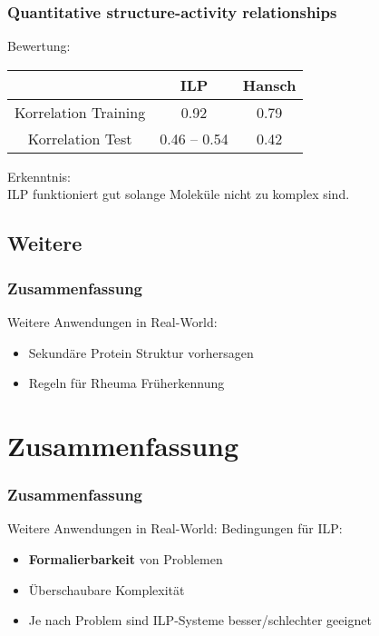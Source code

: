 \begin{frame}
	\frametitle{Quantitative structure-activity relationships}
	Bewertung:
	\begin{center}
		\begin{tabular}{|c|c|c|}
			\hline
			& ILP & Hansch\\
			\hline
			Korrelation Training & 0.92 & 0.79\\
			\hline
			Korrelation Test     & 0.46 -- 0.54 & 0.42\\
			\hline
		\end{tabular}
		\end{center}
		Erkenntnis:\\
		ILP funktioniert gut solange Moleküle nicht zu komplex sind.
\end{frame}

\subsection{Weitere}
\begin{frame}
	\frametitle{Zusammenfassung}
	Weitere Anwendungen in Real-World:
	\begin{itemize}
		\item Sekundäre Protein Struktur vorhersagen
		\item Regeln für Rheuma Früherkennung
	\end{itemize}
\end{frame}

\section{Zusammenfassung}
\begin{frame}
	\frametitle{Zusammenfassung}
	Weitere Anwendungen in Real-World:
	Bedingungen für ILP:
	\begin{itemize}
		\item \textbf{Formalierbarkeit} von Problemen
		\item Überschaubare Komplexität
		\item Je nach Problem sind ILP-Systeme besser/schlechter geeignet
	\end{itemize}
\end{frame}
